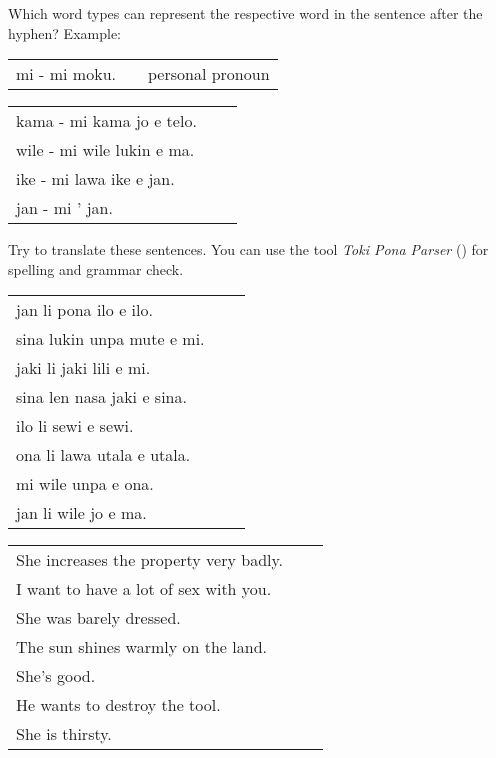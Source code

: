 Which word types can represent the respective word in the sentence after the hyphen?
Example:

\begin{supertabular}{p{5,5cm}|ll}
    mi - mi moku. &  & personal pronoun \\
\end{supertabular}

\begin{supertabular}{p{5,5cm}|ll}
    kama - mi kama jo e telo.  &  & \\
    wile - mi wile lukin e ma. &  & \\
    ike - mi lawa ike e jan.   &  & \\
    jan - mi ' jan.            &  & \\
\end{supertabular}

Try to translate these sentences.
You can use the tool \textit{Toki Pona Parser} (\cite{www:rowa:02}) for spelling and grammar check.

\begin{supertabular}{p{5,5cm}|ll}
    jan li pona ilo e ilo.     &  & \\ %
    sina lukin unpa mute e mi. &  & \\ %
    jaki li jaki lili e mi.    &  & \\ %
    sina len nasa jaki e sina. &  & \\ %
    ilo li sewi e sewi.        &  & \\ %
    ona li lawa utala e utala. &  & \\ %
    mi wile unpa e ona.        &  & \\
    jan li wile jo e ma.       &  & \\
\end{supertabular}

\begin{supertabular}{p{5,5cm}|ll}
    She increases the property very badly. &  & \\ %
    I want to have a lot of sex with you.  &  & \\ %
    She was barely dressed.                &  & \\ %
    The sun shines warmly on the land.     &  & \\ %
    She's good.                            &  & \\ %
    He wants to destroy the tool.          &  & \\
    She is thirsty.                        &  & \\
\end{supertabular}
